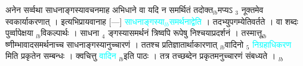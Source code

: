 \documentclass[article,12pt,a4paper]{memoir}%
\newcommand{\quotelemma}[1]{\textcolor{cyan}{#1}}
\newcounter{parCount}
\begin{document}
	  
	  \pstart \leavevmode%
	अनेन सर्व्वथा साधनाङ्गस्यावचनमाह अभिधाने वा यदि न समर्थितं तदोक्त{\tiny $_{lb}$}मप्यऽ {\tiny $_{3}$} नूक्तमेव स्वकार्याकरणात् । इत्यभिप्रायवानाह [—] \quotelemma{साधनाङ्गस्या{\tiny $_{lb}$}समर्थनाद्वेति} \cite[1b2]{vn-msN} । तदभ्युपगम्येतिवर्तते । वा शब्दः पुर्व्वापेक्षया {\tiny $_{lb}$}विकल्पार्थः । साधना {\tiny $_{4}$} ङ्गस्यासमर्थनं त्रिष्वपि रूपेषु निश्चयाप्रदर्शनं । तस्मात्तू{\tiny $_{lb}$}ष्णीम्भावादसमर्थनाच्च साधनाङ्गस्यानुच्चारणं । ततश्च प्रतिज्ञातार्थाकारणात् {\tiny $_{lb}$}वादिनो {\tiny $_{5}$} \quotelemma{निग्रहाधिकरण} मिति \cite[1b2]{vn-msN} प्रकृतेन सम्बन्धः । क्वचित्तु \quotelemma{वादिन} {\tiny $_{lb}$}इति पाठः । तत्र तच्छब्देन प्रकृतमनुच्चारणं संबध्यते ।
	{}
	\pend%
      {\tiny $_{lb}$}
\end{document}
